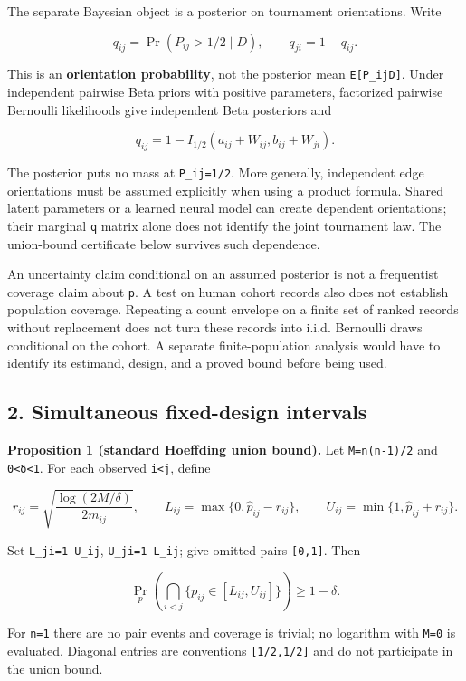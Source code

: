 \documentclass[
  11pt,
]{article}
\begin{document}
The separate Bayesian object is a posterior on tournament orientations.
Write

\[
q_{ij}=\Pr(P_{ij}>1/2\mid D),\qquad q_{ji}=1-q_{ij}.
\]

This is an \textbf{orientation probability}, not the posterior mean
\texttt{E{[}P\_ij\textbar{}D{]}}. Under independent pairwise Beta priors
with positive parameters, factorized pairwise Bernoulli likelihoods give
independent Beta posteriors and

\[
q_{ij}=1-I_{1/2}(a_{ij}+W_{ij},b_{ij}+W_{ji}).
\]

The posterior puts no mass at \texttt{P\_ij=1/2}. More generally,
independent edge orientations must be assumed explicitly when using a
product formula. Shared latent parameters or a learned neural model can
create dependent orientations; their marginal \texttt{q} matrix alone
does not identify the joint tournament law. The union-bound certificate
below survives such dependence.

An uncertainty claim conditional on an assumed posterior is not a
frequentist coverage claim about \texttt{p}. A test on human cohort
records also does not establish population coverage. Repeating a count
envelope on a finite set of ranked records without replacement does not
turn these records into i.i.d. Bernoulli draws conditional on the
cohort. A separate finite-population analysis would have to identify its
estimand, design, and a proved bound before being used.

\hypertarget{simultaneous-fixed-design-intervals}{%
\subsection{2. Simultaneous fixed-design
intervals}\label{simultaneous-fixed-design-intervals}}

\textbf{Proposition 1 (standard Hoeffding union bound).} Let
\texttt{M=n(n-1)/2} and \texttt{0\textless{}δ\textless{}1}. For each
observed \texttt{i\textless{}j}, define

\[
r_{ij}=\sqrt{\frac{\log(2M/\delta)}{2m_{ij}}},\qquad
L_{ij}=\max\{0,\widehat p_{ij}-r_{ij}\},\qquad
U_{ij}=\min\{1,\widehat p_{ij}+r_{ij}\}.
\]

Set \texttt{L\_ji=1-U\_ij}, \texttt{U\_ji=1-L\_ij}; give omitted pairs
\texttt{{[}0,1{]}}. Then

\[
\Pr_p\!\left(\bigcap_{i<j}\{p_{ij}\in[L_{ij},U_{ij}]\}\right)
\ge 1-\delta.
\]

For \texttt{n=1} there are no pair events and coverage is trivial; no
logarithm with \texttt{M=0} is evaluated. Diagonal entries are
conventions \texttt{{[}1/2,1/2{]}} and do not participate in the union
bound.
\end{document}
